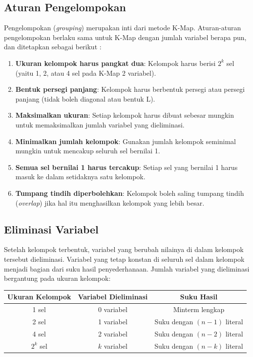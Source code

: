 \subsection{Aturan Pengelompokan}

Pengelompokan (\textit{grouping}) merupakan inti dari metode K-Map. Aturan-aturan pengelompokan berlaku sama untuk K-Map dengan jumlah variabel berapa pun, dan ditetapkan sebagai berikut \cite{wiki_karnaugh}:

\begin{enumerate}[label=\textbf{R\arabic*.}]
  \item \textbf{Ukuran kelompok harus pangkat dua}: Kelompok harus berisi $2^k$ sel (yaitu 1, 2, atau 4 sel pada K-Map 2 variabel).
  \item \textbf{Bentuk persegi panjang}: Kelompok harus berbentuk persegi atau persegi panjang (tidak boleh diagonal atau bentuk L).
  \item \textbf{Maksimalkan ukuran}: Setiap kelompok harus dibuat sebesar mungkin untuk memaksimalkan jumlah variabel yang dieliminasi.
  \item \textbf{Minimalkan jumlah kelompok}: Gunakan jumlah kelompok seminimal mungkin untuk mencakup seluruh sel bernilai 1.
  \item \textbf{Semua sel bernilai 1 harus tercakup}: Setiap sel yang bernilai 1 harus masuk ke dalam setidaknya satu kelompok.
  \item \textbf{Tumpang tindih diperbolehkan}: Kelompok boleh saling tumpang tindih (\textit{overlap}) jika hal itu menghasilkan kelompok yang lebih besar.
\end{enumerate}

\subsection{Eliminasi Variabel}

Setelah kelompok terbentuk, variabel yang berubah nilainya di dalam kelompok tersebut dieliminasi. Variabel yang tetap konstan di seluruh sel dalam kelompok menjadi bagian dari suku hasil penyederhanaan. Jumlah variabel yang dieliminasi bergantung pada ukuran kelompok:

\begin{center}
\renewcommand{\arraystretch}{1.2}
\begin{tabular}{|c|c|c|}
\hline
\textbf{Ukuran Kelompok} & \textbf{Variabel Dieliminasi} & \textbf{Suku Hasil} \\ \hline
1 sel & 0 variabel & Minterm lengkap \\ \hline
2 sel & 1 variabel & Suku dengan $(n-1)$ literal \\ \hline
4 sel & 2 variabel & Suku dengan $(n-2)$ literal \\ \hline
$2^k$ sel & $k$ variabel & Suku dengan $(n-k)$ literal \\ \hline
\end{tabular}
\end{center}

